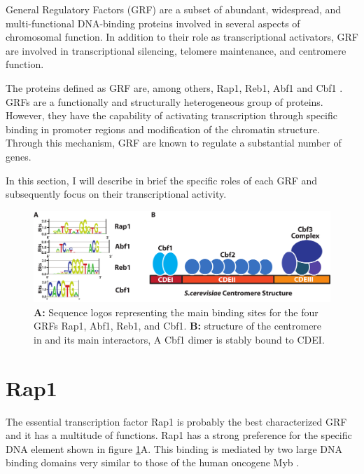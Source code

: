 General Regulatory Factors (GRF) are a subset of abundant, widespread, and multi-functional DNA-binding proteins involved in several aspects of chromosomal function. 
In addition to their role as transcriptional activators, GRF are involved in transcriptional silencing, telomere maintenance, and centromere function.

The proteins defined as GRF are, among others, Rap1, Reb1, Abf1 and Cbf1 \cite{diffley:1992:global}. 
GRFs are a functionally and structurally heterogeneous group of proteins. 
However, they have the capability of activating transcription through specific binding in promoter regions and modification of the chromatin structure. 
Through this mechanism, GRF are known to regulate a substantial number of genes.

In this section, I will describe in brief the specific roles of each GRF and subsequently focus on their transcriptional activity.

\begin{figure}[ht]

\centering
\includegraphics[width=\textwidth]{figures/introduction/grfCentromere}
\caption[GRFs binding sites and \cer{} centromere structure]{\textbf{A:} Sequence logos representing the main binding sites for the four GRFs Rap1, Abf1, Reb1, and Cbf1. \textbf{B:} structure of the centromere in \cer{} and its main interactors, A Cbf1 dimer is stably bound to CDEI.}
\label{fig:grfCentromere}

\end{figure}

\section{Rap1}

The essential transcription factor Rap1 is probably the best characterized GRF and it has a multitude of functions. 
Rap1 has a strong preference for the specific DNA element shown in figure \ref{fig:grfCentromere}A. This binding is mediated by two large DNA binding domains very similar to those of the human oncogene Myb \cite{rhee:2011:comprehensive}. 

